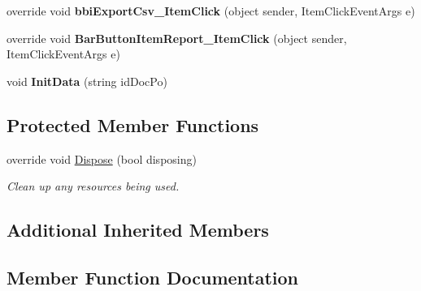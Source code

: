 \begin{DoxyCompactItemize}
override void {\bfseries bbi\+Export\+Csv\+\_\+\+Item\+Click} (object sender, Item\+Click\+Event\+Args e)
\item 
\mbox{\label{class_h_k_supply_1_1_forms_1_1_supply_1_1_supply_materials_1_1_purchase_order_materials_aa529970106218e306f2ffd0ff802f47c}} 
override void {\bfseries Bar\+Button\+Item\+Report\+\_\+\+Item\+Click} (object sender, Item\+Click\+Event\+Args e)
\item 
\mbox{\label{class_h_k_supply_1_1_forms_1_1_supply_1_1_supply_materials_1_1_purchase_order_materials_a3af4ed179a59961f1e660bf85bdf62b3}} 
void {\bfseries Init\+Data} (string id\+Doc\+Po)
\end{DoxyCompactItemize}
\subsection*{Protected Member Functions}
\begin{DoxyCompactItemize}
\item 
override void \mbox{\hyperlink{class_h_k_supply_1_1_forms_1_1_supply_1_1_supply_materials_1_1_purchase_order_materials_a7c4760438702feae54ee4471c1b3eed8}{Dispose}} (bool disposing)
\begin{DoxyCompactList}\small\item\em Clean up any resources being used. \end{DoxyCompactList}\end{DoxyCompactItemize}
\subsection*{Additional Inherited Members}


\subsection{Member Function Documentation}
\mbox{\label{class_h_k_supply_1_1_forms_1_1_supply_1_1_supply_materials_1_1_purchase_order_materials_a7c4760438702feae54ee4471c1b3eed8}} 
